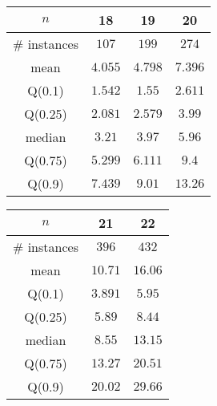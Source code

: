 \begin{tabular}{c|ccc} 
\hline 
$n$ & 18 & 19 & 20 \tabularnewline 
\hline 
\hline 
\# instances & $107$ & $199$ & $274$ \tabularnewline 
mean & $4.055$ & $4.798$ & $7.396$ \tabularnewline 
Q(0.1) & $1.542$ & $1.55$ & $2.611$ \tabularnewline 
Q(0.25) & $2.081$ & $2.579$ & $3.99$ \tabularnewline 
median & $3.21$ & $3.97$ & $5.96$ \tabularnewline 
Q(0.75) & $5.299$ & $6.111$ & $9.4$ \tabularnewline 
Q(0.9) & $7.439$ & $9.01$ & $13.26$ \tabularnewline 
\hline 
\end{tabular} 
\medskip{} 

\begin{tabular}{c|cc} 
\hline 
$n$ & 21 & 22 \tabularnewline 
\hline 
\hline 
\# instances & $396$ & $432$ \tabularnewline 
mean & $10.71$ & $16.06$ \tabularnewline 
Q(0.1) & $3.891$ & $5.95$ \tabularnewline 
Q(0.25) & $5.89$ & $8.44$ \tabularnewline 
median & $8.55$ & $13.15$ \tabularnewline 
Q(0.75) & $13.27$ & $20.51$ \tabularnewline 
Q(0.9) & $20.02$ & $29.66$ \tabularnewline 
\hline 
\end{tabular} 
\medskip{} 

